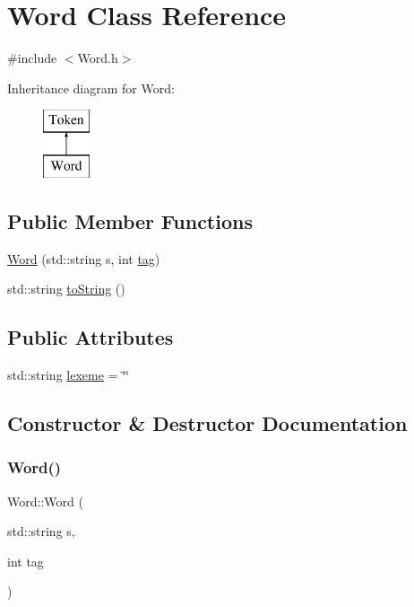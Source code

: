 \hypertarget{class_word}{}\section{Word Class Reference}
\label{class_word}


{\ttfamily \#include $<$Word.\+h$>$}

Inheritance diagram for Word\+:\begin{figure}[H]
\begin{center}
\leavevmode
\includegraphics[height=2.000000cm]{class_word}
\end{center}
\end{figure}
\subsection*{Public Member Functions}
\begin{DoxyCompactItemize}
\item 
\hyperlink{class_word_acb127ce0ab789dc0ecfc407dec786ac2}{Word} (std\+::string s, int \hyperlink{class_token_a2a4b0e1b648c2a9be1976004eb3c4ff0}{tag})
\item 
std\+::string \hyperlink{class_word_a950a81bfd0fc369b0eb8d0d6b27e2870}{to\+String} ()
\end{DoxyCompactItemize}
\subsection*{Public Attributes}
\begin{DoxyCompactItemize}
\item 
std\+::string \hyperlink{class_word_a34691d869ec57b2a0b7a8eb41230b92a}{lexeme} = \char`\"{}\char`\"{}
\end{DoxyCompactItemize}


\subsection{Constructor \& Destructor Documentation}
\mbox{\label{class_word_acb127ce0ab789dc0ecfc407dec786ac2}} 
\subsubsection{\texorpdfstring{Word()}{Word()}}
{\footnotesize\ttfamily Word\+::\+Word (\begin{DoxyParamCaption}\item[{std\+::string}]{s,  }\item[{int}]{tag }\end{DoxyParamCaption})}



